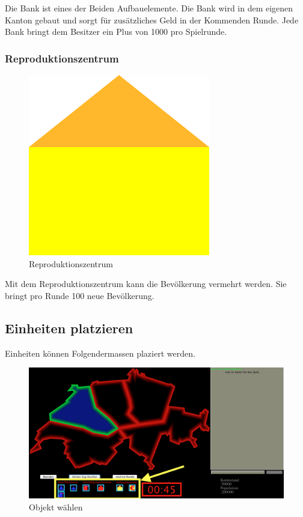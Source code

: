 \documentclass[ngerman, 12pt, pdftex]{scrartcl}[2006/07/30]
\begin{document}
Die Bank ist eines der Beiden Aufbauelemente. Die Bank wird in dem eigenen Kanton gebaut und sorgt für zusätzliches Geld in der Kommenden Runde. Jede Bank bringt dem Besitzer ein Plus von 1000 pro Spielrunde.

\newpage

\subsubsection{Reproduktionszentrum}

\begin{figure}[h]
\centering
\includegraphics[scale=2]{spiel/Repro.png}
\caption{Reproduktionszentrum}
\end{figure}

Mit dem Reproduktionszentrum kann die Bevölkerung vermehrt werden. Sie bringt pro Runde 100 neue Bevölkerung.

\newpage

\subsection{Einheiten platzieren}

Einheiten können Folgendermassen plaziert werden. 

\begin{figure}[h]
\centering
\includegraphics[scale=0.3]{spiel/Objekt_aussuchen.png}
\caption{Objekt wählen}
\end{figure}
\end{document}
